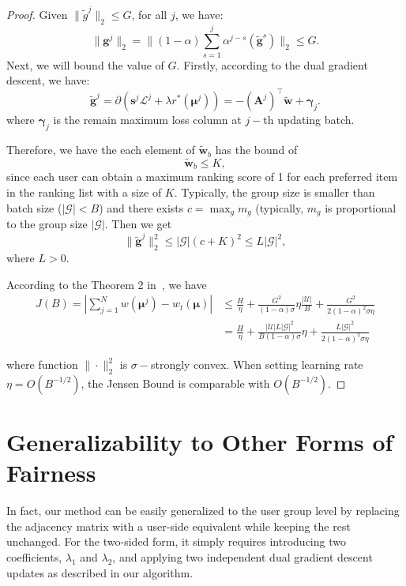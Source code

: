 \begin{proof}
    Given $\|\widetilde{g}^j\|_2\leq G$, for all $j$, we have:
    \[
        \| \mathbf{g}^j \|_2 = \|(1-\alpha)\sum_{s=1}^j\alpha^{j-s}(\widetilde{\mathbf{g}}^s)\|_2 \leq G.
    \]
    Next, we will bound the value of $G$. Firstly, according to the dual gradient descent, we have:
    \[
        \widetilde{\bm{g}}^j=\partial (\bm{s}^j\mathcal{L}^j + \lambda r^*(\bm{\mu}^j)) = -(\mathbf{A}^j)^{\top} \widetilde{\bm{w}}+ \bm{\gamma}_j.
    \]
    where $\bm{\gamma}_j$ is the remain maximum loss column at $j-$th updating batch. 
    
    Therefore, we have the each element of $\widetilde{\bm{w}}_b$ has the bound of
    \[
        \widetilde{\bm{w}}_b \leq K,
    \]
   since each user can obtain a maximum ranking score of 1 for each preferred item in the ranking list with a size of $K$. Typically, the group size is smaller than batch size ($|\mathcal{G}|<B$) and there exists $c=\max_g m_g$ (typically, $m_g$ is proportional to the group size $|\mathcal{G}|$. Then we get
    \[
        \|\widetilde{\bm{g}}^j\|_2^2 \leq |\mathcal{G}|(c + K)^2 \leq L|\mathcal{G}|^2,
    \]
    where $L>0$.

    
    According to the Theorem 2 in~\cite{balseiro2021regularized}, we have
    \begin{align*}
        J(B) = |\sum_{j=1}^{N}w(\bm{\mu}^j) - w_t(\bm{\mu})| &\leq \frac{H}{\eta} + \frac{G^2}{(1-\alpha)\sigma}\eta\frac{|\mathcal{U}|}{B} + \frac{G^2}{2(1-\alpha)^2\sigma\eta} \\
        &= \frac{H}{\eta} + \frac{|\mathcal{U}|L|\mathcal{G}|^2}{B(1-\alpha)\sigma}\eta + \frac{L|\mathcal{G}|^2}{2(1-\alpha)^2\sigma\eta}
    \end{align*}

    where function $\|\cdot\|_2^2$ is $\sigma-$strongly convex.
    When setting learning rate $\eta=O(B^{-1/2})$, the Jensen Bound is comparable with $O(B^{-1/2})$.
    


    
    
\end{proof}


\section{Generalizability to Other Forms of Fairness}\label{app:generalize}
In fact, our method can be easily generalized to the user group level by replacing the adjacency matrix with a user-side equivalent while keeping the rest unchanged. For the two-sided form, it simply requires introducing two coefficients, $\lambda_1$ and $\lambda_2$, and applying two independent dual gradient descent updates as described in our algorithm.

